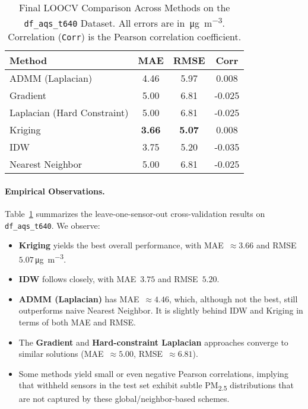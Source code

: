 \documentclass[12pt]{article}                                %
\begin{document}
\begin{table}[!ht]
\centering
\caption{Final LOOCV Comparison Across Methods on the \texttt{df\_aqs\_t640} Dataset. 
All errors are in \,\si{\micro\gram\per\cubic\meter}. 
Correlation (\texttt{Corr}) is the Pearson correlation coefficient.}
\label{tab:finalResultsActual}
\begin{tabular}{lccc}
\toprule
\textbf{Method} & \textbf{MAE} & \textbf{RMSE} & \textbf{Corr}\\
\midrule
ADMM (Laplacian)               & 4.46  & 5.97  & 0.008  \\
Gradient                       & 5.00  & 6.81  & -0.025 \\
Laplacian (Hard Constraint)    & 5.00  & 6.81  & -0.025 \\
Kriging                        & \textbf{3.66} & \textbf{5.07} & 0.008 \\
IDW                            & 3.75  & 5.20  & -0.035 \\
Nearest Neighbor               & 5.00  & 6.81  & -0.025 \\
\bottomrule
\end{tabular}
\end{table}

\paragraph{Empirical Observations.}  %
Table~\ref{tab:finalResultsActual} summarizes the leave-one-sensor-out cross-validation 
results on \texttt{df\_aqs\_t640}. We observe:
\begin{itemize}
    \item \textbf{Kriging} yields the best overall performance, with MAE~$\approx 3.66$ 
    and RMSE~$5.07$\,\si{\micro\gram\per\cubic\meter}.
    \item \textbf{IDW} follows closely, with MAE~$3.75$ and RMSE~$5.20$.
    \item \textbf{ADMM (Laplacian)} has MAE~$\approx 4.46$, which, although not the best, 
    still outperforms naive Nearest Neighbor. It is slightly behind IDW and Kriging in terms 
    of both MAE and RMSE.
    \item The \textbf{Gradient} and \textbf{Hard-constraint Laplacian} approaches converge 
    to similar solutions (MAE~$\approx 5.00$, RMSE~$\approx 6.81$).
    \item Some methods yield small or even negative Pearson correlations, implying that 
    withheld sensors in the test set exhibit subtle PM\textsubscript{2.5} distributions that 
    are not captured by these global/neighbor-based schemes.
\end{itemize}
\end{document}
